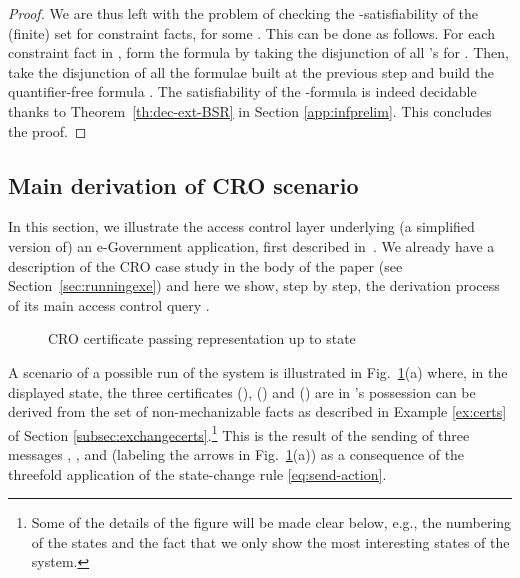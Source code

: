 \documentclass[conference]{llncs}
\newcommand{\CRO}{CRO}
\begin{document}
{\begin{proof}
  We are thus left with the problem of checking the
  -satisfiability of the (finite) set 
  for constraint facts, for some .  This can be done as
  follows.  For each constraint fact  in
  , form the formula  by taking the disjunction
  of all 's for .  Then, take the disjunction of all
  the formulae  built at the previous step and build the
  quantifier-free formula .  The satisfiability of the
  -formula  is indeed decidable
  thanks to Theorem~\ref{th:dec-ext-BSR} in Section \ref{app:infprelim}. This concludes the proof.  
\end{proof}



\subsection{Main derivation of \CRO{} scenario}
\label{CR}

In this section, we illustrate the access control layer underlying (a
simplified version of) an e-Government application, first described
in~\cite{avantssar}. We already have a description of the \CRO{} case study in
the body of the paper (see Section~\ref{sec:runningexe}) and here we
show, step by step, the derivation process of its main access control query 
.



\begin{figure}[t] \center
 \qquad\qquad\qquad
{}\qquad\qquad 
\caption{\CRO{} certificate passing representation up to state  \label{fig:CRO1}}
\end{figure}


A scenario of a possible run of the system is illustrated in
Fig.~\ref{fig:CRO1}(a) where, in the displayed state, the three
certificates (), () and () are in 's possession can be derived from the set of non-mechanizable facts as described in Example \ref{ex:certs} of Section \ref{subsec:exchangecerts}.\footnote{Some of the details of
the figure will be made clear below, e.g., the numbering of the states
and the fact that we only show the most interesting states of the
system.}
This is the result of the sending of three messages , , and 
(labeling the arrows in Fig.~\ref{fig:CRO1}(a)) as a consequence of the threefold application of the state-change rule \eqref{eq:send-action}.

}
\end{document}

